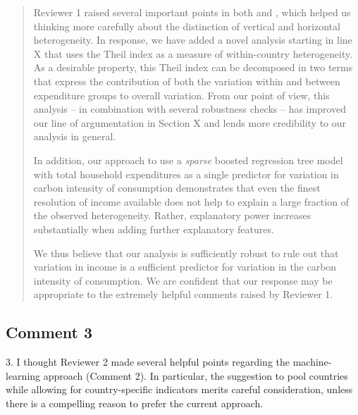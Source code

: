 \documentclass[11pt]{article}
\newenvironment{response}
{\begin{quote}\color{black}}
{\end{quote}}
\begin{document}
\begin{response}

Reviewer 1 raised several important points in both  and , which helped us thinking more carefully about the distinction of vertical and horizontal heterogeneity. In response, we have added a novel analysis starting in line X that uses the Theil index as a measure of within-country heterogeneity. As a desirable property, this Theil index can be decomposed in two terms that express the contribution of both the variation within and between expenditure groups to overall variation. From our point of view, this analysis -- in combination with several robustness checks -- has improved our line of argumentation in Section X and lends more credibility to our analysis in general.

In addition, our approach to use a \textit{sparse} boosted regression tree model with total household expenditures as a single predictor for variation in carbon intensity of consumption demonstrates that even the finest resolution of income available does not help to explain a large fraction of the observed heterogeneity. Rather, explanatory power increases substantially when adding further explanatory features.

We thus believe that our analysis is sufficiently robust to rule out that variation in income is a sufficient predictor for variation in the carbon intensity of consumption. We are confident that our response may be appropriate to the extremely helpful comments raised by Reviewer 1.

\end{response}

\subsection*{Comment 3}\label{comment_E_3}
\begin{commentbox}
    3. I thought Reviewer 2 made several helpful points regarding the machine-learning approach (Comment 2). In particular, the suggestion to pool countries while allowing for country-specific indicators merits careful consideration, unless there is a compelling reason to prefer the current approach.
\end{commentbox}
\end{document}
